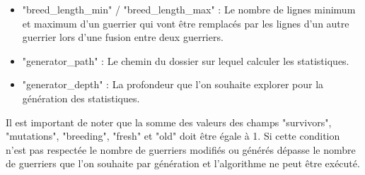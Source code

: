 \documentclass[french]{article}
\begin{document}
\begin{enumerate}
\begin{itemize}
                    	\item "breed\_length\_min" / "breed\_length\_max" : Le nombre de lignes minimum et maximum d'un guerrier qui vont être remplacés par les lignes d'un autre guerrier lors d'une fusion entre deux guerriers.
                    	\item "generator\_path" : Le chemin du dossier sur lequel calculer les statistiques. 
                    	\item "generator\_depth" : La profondeur que l'on souhaite explorer pour la génération des statistiques. 
                    \end{itemize}
                    
                    \bigskip
                    Il est important de noter que la somme des valeurs des champs "survivors", "mutations", "breeding", "fresh" et "old" doit être égale à 1. Si cette condition n'est pas respectée le nombre de guerriers modifiés ou générés dépasse le nombre de guerriers que l'on souhaite par génération et l'algorithme ne peut être exécuté. \\
                    

\end{enumerate}
\end{document}
